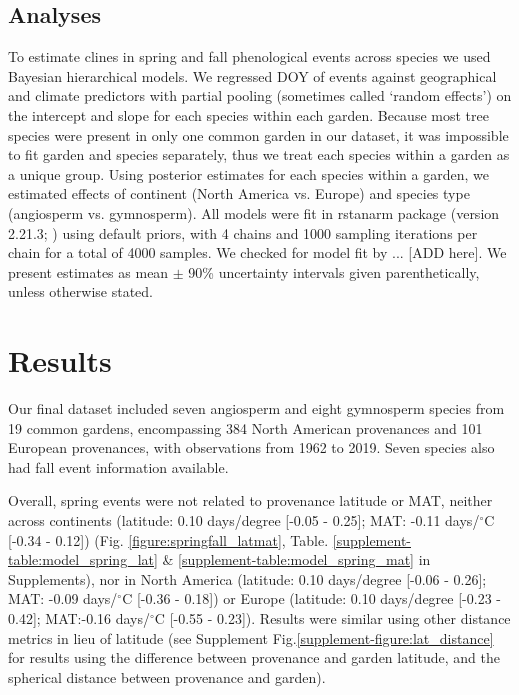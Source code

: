 \documentclass{article}
\begin{document}
\subsection{Analyses}
To estimate clines in spring and fall phenological events across species we used Bayesian hierarchical models. We regressed DOY of events against geographical and climate predictors with partial pooling (sometimes called `random effects') on the intercept and slope for each species within each garden. Because most tree species were present in only one common garden in our dataset, it was impossible to fit garden and species separately, thus we treat each species within a garden as a unique group. Using posterior estimates for each species within a garden, we estimated effects of continent (North America vs. Europe) and species type (angiosperm vs. gymnosperm). All models were fit in rstanarm package (version 2.21.3; \citealp{brilleman2018}) using default priors, with 4 chains and 1000 sampling iterations per chain for a total of 4000 samples. We checked for model fit by ... [ADD here]. We present estimates as mean $\pm$ 90\% uncertainty intervals given parenthetically, unless otherwise stated. 

\section{Results}
Our final dataset included seven angiosperm and eight gymnosperm species from 19 common gardens, encompassing 384 North American provenances and 101 European provenances, with observations from 1962 to 2019. Seven species also had fall event information available. 

Overall, spring events were not related to provenance latitude or MAT, neither across continents (latitude: 0.10 days/degree [-0.05 - 0.25]; MAT: -0.11 days/$^{\circ}$C [-0.34 - 0.12]) (Fig. \ref{figure:springfall_latmat}, Table. \ref{supplement-table:model_spring_lat} \& \ref{supplement-table:model_spring_mat} in Supplements), nor in North America (latitude: 0.10 days/degree [-0.06 - 0.26]; MAT: -0.09 days/$^{\circ}$C [-0.36 - 0.18]) or Europe (latitude: 0.10 days/degree [-0.23 - 0.42]; MAT:-0.16 days/$^{\circ}$C [-0.55 - 0.23]). Results were similar using other distance metrics in lieu of latitude (see Supplement Fig.\ref{supplement-figure:lat_distance} for results using the difference between provenance and garden latitude, and the spherical distance between provenance and garden).
\end{document}
